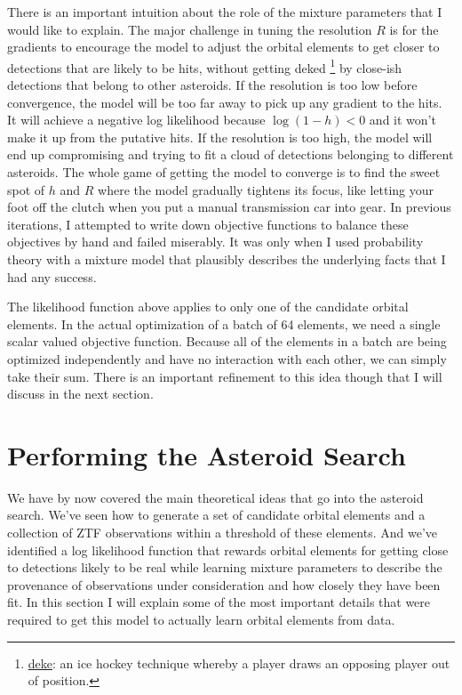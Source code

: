 There is an important intuition about the role of the mixture parameters that I would like to explain.
The major challenge in tuning the resolution $R$ is for the gradients to encourage the model to adjust the orbital elements
to get closer to detections that are likely to be hits, without getting deked 
\footnote{\href{https://en.wikipedia.org/wiki/Deke_(ice_hockey)}{deke}: an ice hockey technique whereby a player draws an opposing player out of position.}
by close-ish detections that belong to other asteroids.
If the resolution is too low before convergence, the model will be too far away to pick up any gradient to the hits.
It will achieve a negative log likelihood because $\log(1-h) < 0$ and it won't make it up from the putative hits.
If the resolution is too high, the model will end up compromising and trying to fit a cloud of detections belonging to different asteroids.
The whole game of getting the model to converge is to find the sweet spot of $h$ and $R$ where the model gradually tightens its focus,
like letting your foot off the clutch when you put a manual transmission car into gear.
In previous iterations, I attempted to write down objective functions to balance these objectives by hand and failed miserably.
It was only when I used probability theory with a mixture model that plausibly describes the underlying facts that I had any success.

The likelihood function above applies to only one of the candidate orbital elements.
In the actual optimization of a batch of 64 elements, we need a single scalar valued objective function.
Because all of the elements in a batch are being optimized independently and have no interaction with each other, we can simply take their sum.
There is an important refinement to this idea though that I will discuss in the next section.


\section{Performing the Asteroid Search}
\label{section_asteroid_search}
We have by now covered the main theoretical ideas that go into the asteroid search.
We've seen how to generate a set of candidate orbital elements and a collection of ZTF observations within a threshold of these elements.
And we've identified a log likelihood function that rewards orbital elements for getting close to detections likely to be real 
while learning mixture parameters to describe the provenance of observations under consideration and how closely they have been fit.
In this section I will explain some of the most important details that were required to get this model to actually learn orbital elements from data.

